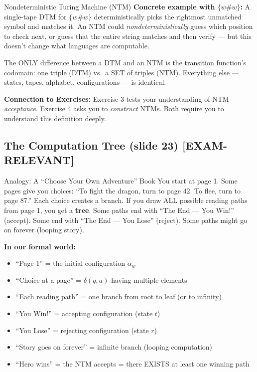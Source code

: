 \documentclass[11pt,a4paper]{article}
\newcommand{\kemark}{\textcolor{red!70!black}{\textbf{[EXAM-RELEVANT]}}}
\newcommand{\kt}[1]{\par\vspace{0.3em}\colorbox{yellow!60}{\parbox{\dimexpr\linewidth-2\fboxsep}{#1}}\vspace{0.3em}}
\begin{document}
\begin{definitionbox}{Nondeterministic Turing Machine (NTM)}
\textbf{Concrete example with $\{w\#w\}$:} A single-tape DTM for $\{w\#w\}$ deterministically picks the rightmost unmatched symbol and matches it. An NTM could \textit{nondeterministically} guess which position to check next, or guess that the entire string matches and then verify --- but this doesn't change what languages are computable.

\kt{The ONLY difference between a DTM and an NTM is the transition function's codomain: one triple (DTM) vs.\ a SET of triples (NTM). Everything else --- states, tapes, alphabet, configurations --- is identical.}

\textbf{Connection to Exercises:} Exercise 3 tests your understanding of NTM \textit{acceptance}. Exercise 4 asks you to \textit{construct} NTMs. Both require you to understand this definition deeply.
\end{definitionbox}

\subsection{The Computation Tree (slide 23) \kemark}

\begin{notebox}{Analogy: A ``Choose Your Own Adventure'' Book}
You start at page 1. Some pages give you choices: ``To fight the dragon, turn to page 42. To flee, turn to page 87.'' Each choice creates a branch. If you draw ALL possible reading paths from page 1, you get a \textbf{tree}. Some paths end with ``The End --- You Win!'' (accept). Some end with ``The End --- You Lose'' (reject). Some paths might go on forever (looping story).

\textbf{In our formal world:}
\begin{itemize}[nosep]
\item ``Page 1'' = the initial configuration $\alpha_w$
\item ``Choice at a page'' = $\delta(q, a)$ having multiple elements
\item ``Each reading path'' = one branch from root to leaf (or to infinity)
\item ``You Win!'' = accepting configuration (state $t$)
\item ``You Lose'' = rejecting configuration (state $r$)
\item ``Story goes on forever'' = infinite branch (looping computation)
\item ``Hero wins'' = the NTM accepts = there EXISTS at least one winning path
\end{itemize}
\end{notebox}
\end{document}
